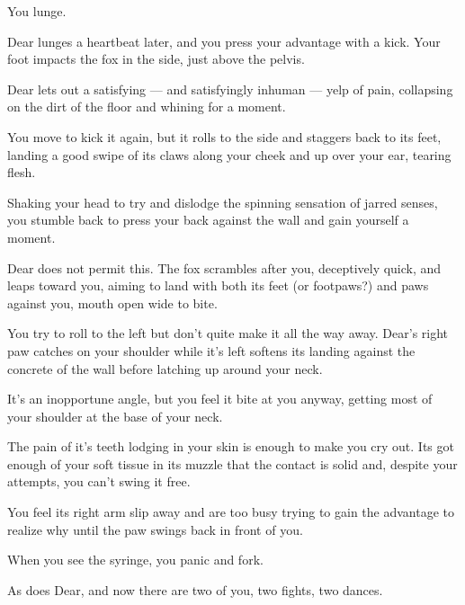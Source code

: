 You lunge.

Dear lunges a heartbeat later, and you press your advantage with a kick. Your foot impacts the fox in the side, just above the pelvis.

Dear lets out a satisfying --- and satisfyingly inhuman --- yelp of pain, collapsing on the dirt of the floor and whining for a moment.

You move to kick it again, but it rolls to the side and staggers back to its feet, landing a good swipe of its claws along your cheek and up over your ear, tearing flesh.

Shaking your head to try and dislodge the spinning sensation of jarred senses, you stumble back to press your back against the wall and gain yourself a moment.

Dear does not permit this. The fox scrambles after you, deceptively quick, and leaps toward you, aiming to land with both its feet (or footpaws?) and paws against you, mouth open wide to bite.

You try to roll to the left but don't quite make it all the way away. Dear's right paw catches on your shoulder while it's left softens its landing against the concrete of the wall before latching up around your neck.

It's an inopportune angle, but you feel it bite at you anyway, getting most of your shoulder at the base of your neck.

The pain of it's teeth lodging in your skin is enough to make you cry out. Its got enough of your soft tissue in its muzzle that the contact is solid and, despite your attempts, you can't swing it free.

\newpage

\null
\vfill

You feel its right arm slip away and are too busy trying to gain the advantage to realize why until the paw swings back in front of you.

\vfill

\newpage

\null
\vfill

When you see the syringe, you panic and fork.

\vfill

\newpage

\null
\vfill

As does Dear, and now there are two of you, two fights, two dances.

\vfill

\newpage

